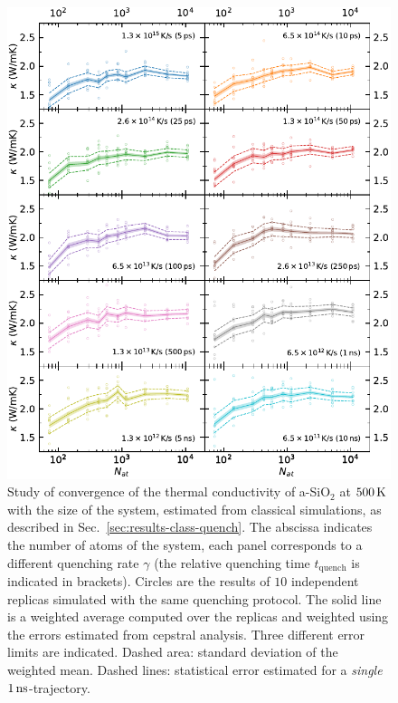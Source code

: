 \begin{figure}[!tb]
    \centering
    \includegraphics[width=\textwidth]{chapters/chapter6/figures/Silica_NVT_kappa_NATconv_tesi.pdf}
    \caption{Study of convergence of the thermal conductivity of a-SiO$_2$ at $500\,\mathrm{K}$ with the size of the system, estimated from classical simulations, as described in Sec.~\ref{sec:results-class-quench}. 
    The abscissa indicates the number of atoms of the system, each panel corresponds to a different quenching rate $\gamma$ (the relative quenching time $t_\mathrm{quench}$ is indicated in brackets). 
    Circles are the results of $10$ independent replicas simulated with the same quenching protocol. The solid line is a weighted average computed over the replicas and weighted using the errors estimated from cepstral analysis. Three different error limits are indicated. 
    Dashed area: standard deviation of the weighted mean. 
    Dashed lines: statistical error estimated for a \emph{single} $1\,\mathrm{ns}$-trajectory. 
    }
    \label{fig:results-class-kappa-vs-size}
\end{figure}

